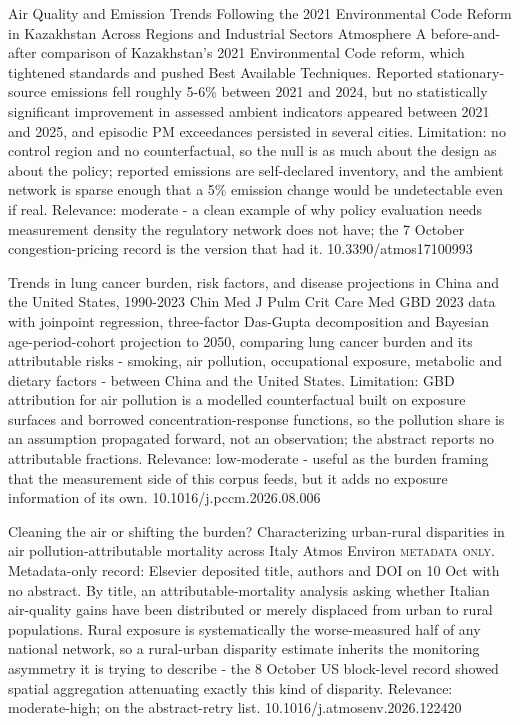 \documentclass[10pt]{article}
\begin{document}
\par{}\baselineskip{}\baselineskip
{}

{Air Quality and Emission Trends Following the 2021 Environmental Code Reform in Kazakhstan Across Regions and Industrial Sectors}
{Atmosphere}
{A before-and-after comparison of Kazakhstan's 2021 Environmental Code reform, which tightened standards and pushed Best Available Techniques. Reported stationary-source emissions fell roughly 5-6\% between 2021 and 2024, but no statistically significant improvement in assessed ambient indicators appeared between 2021 and 2025, and episodic PM exceedances persisted in several cities. Limitation: no control region and no counterfactual, so the null is as much about the design as about the policy; reported emissions are self-declared inventory, and the ambient network is sparse enough that a 5\% emission change would be undetectable even if real. Relevance: moderate - a clean example of why policy evaluation needs measurement density the regulatory network does not have; the 7 October congestion-pricing record is the version that had it.}
{10.3390/atmos17100993}

{Trends in lung cancer burden, risk factors, and disease projections in China and the United States, 1990-2023}
{Chin Med J Pulm Crit Care Med}
{GBD 2023 data with joinpoint regression, three-factor Das-Gupta decomposition and Bayesian age-period-cohort projection to 2050, comparing lung cancer burden and its attributable risks - smoking, air pollution, occupational exposure, metabolic and dietary factors - between China and the United States. Limitation: GBD attribution for air pollution is a modelled counterfactual built on exposure surfaces and borrowed concentration-response functions, so the pollution share is an assumption propagated forward, not an observation; the abstract reports no attributable fractions. Relevance: low-moderate - useful as the burden framing that the measurement side of this corpus feeds, but it adds no exposure information of its own.}
{10.1016/j.pccm.2026.08.006}

{Cleaning the air or shifting the burden? Characterizing urban-rural disparities in air pollution-attributable mortality across Italy}
{Atmos Environ}
{\textsc{metadata only.} Metadata-only record: Elsevier deposited title, authors and DOI on 10 Oct with no abstract. By title, an attributable-mortality analysis asking whether Italian air-quality gains have been distributed or merely displaced from urban to rural populations. Rural exposure is systematically the worse-measured half of any national network, so a rural-urban disparity estimate inherits the monitoring asymmetry it is trying to describe - the 8 October US block-level record showed spatial aggregation attenuating exactly this kind of disparity. Relevance: moderate-high; on the abstract-retry list.}
{10.1016/j.atmosenv.2026.122420}
\end{document}
